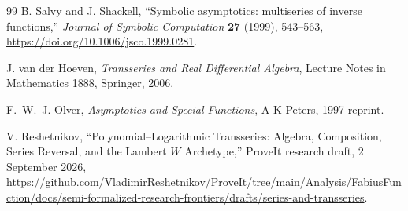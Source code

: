 \documentclass[11pt]{article}
\theoremstyle{definition}
\theoremstyle{remark}
\begin{document}
\begin{thebibliography}{99}
B. Salvy and J. Shackell,
``Symbolic asymptotics: multiseries of inverse functions,''
\emph{Journal of Symbolic Computation} \textbf{27} (1999), 543--563,
\url{https://doi.org/10.1006/jsco.1999.0281}.

J. van der Hoeven,
\emph{Transseries and Real Differential Algebra},
Lecture Notes in Mathematics 1888, Springer, 2006.

F.~W.~J. Olver,
\emph{Asymptotics and Special Functions},
A K Peters, 1997 reprint.

V. Reshetnikov,
``Polynomial--Logarithmic Transseries: Algebra, Composition, Series Reversal, and the Lambert \(W\) Archetype,''
ProveIt research draft, 2 September 2026,
\url{https://github.com/VladimirReshetnikov/ProveIt/tree/main/Analysis/FabiusFunction/docs/semi-formalized-research-frontiers/drafts/series-and-transseries}.

\end{thebibliography}
\endgroup
\end{document}
